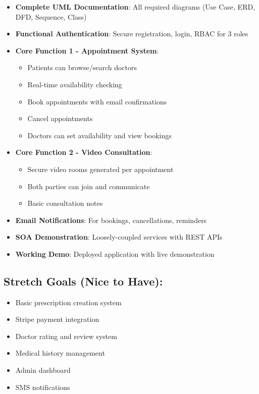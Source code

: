\documentclass[11pt,a4paper]{article}
\begin{document}
\begin{itemize}[leftmargin=*, itemsep=0.1em]
    \item \textbf{Complete UML Documentation}: All required diagrams (Use Case, ERD, DFD, Sequence, Class)
    \item \textbf{Functional Authentication}: Secure registration, login, RBAC for 3 roles
    \item \textbf{Core Function 1 - Appointment System}:
    \begin{itemize}
        \item Patients can browse/search doctors
        \item Real-time availability checking
        \item Book appointments with email confirmations
        \item Cancel appointments
        \item Doctors can set availability and view bookings
    \end{itemize}
    \item \textbf{Core Function 2 - Video Consultation}:
    \begin{itemize}
        \item Secure video rooms generated per appointment
        \item Both parties can join and communicate
        \item Basic consultation notes
    \end{itemize}
    \item \textbf{Email Notifications}: For bookings, cancellations, reminders
    \item \textbf{SOA Demonstration}: Loosely-coupled services with REST APIs
    \item \textbf{Working Demo}: Deployed application with live demonstration
\end{itemize}

\subsection*{Stretch Goals (Nice to Have):}

\begin{itemize}[leftmargin=*, itemsep=0.1em]
    \item Basic prescription creation system
    \item Stripe payment integration
    \item Doctor rating and review system
    \item Medical history management
    \item Admin dashboard
    \item SMS notifications
\end{itemize}
\end{document}
